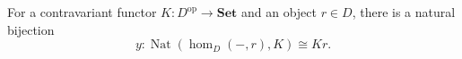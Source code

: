 For a contravariant functor $K: D^{\text{op}} \rightarrow \mathbf{Set}$ and an object $r \in D$, there is a natural bijection
\[
y: \operatorname{Nat}(\hom_D(-, r), K) \cong Kr.
\]